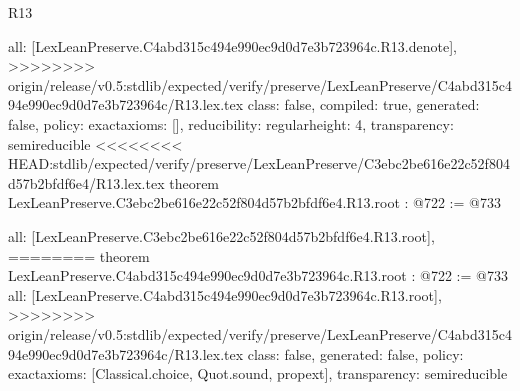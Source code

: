 \begin{lexlean}{R13}
\begin{coremodule}
{{{{{{{{{  all: [LexLeanPreserve.C4abd315c494e990ec9d0d7e3b723964c.R13.denote],
>>>>>>>> origin/release/v0.5:stdlib/expected/verify/preserve/LexLeanPreserve/C4abd315c494e990ec9d0d7e3b723964c/R13.lex.tex
  class: false,
  compiled: true,
  generated: false,
  policy: exact{axioms: []},
  reducibility: regular{height: 4},
  transparency: semireducible
}
<<<<<<<< HEAD:stdlib/expected/verify/preserve/LexLeanPreserve/C3ebc2be616e22c52f804d57b2bfdf6e4/R13.lex.tex
theorem LexLeanPreserve.C3ebc2be616e22c52f804d57b2bfdf6e4.R13.root : @722 := @733 {
  all: [LexLeanPreserve.C3ebc2be616e22c52f804d57b2bfdf6e4.R13.root],
========
theorem LexLeanPreserve.C4abd315c494e990ec9d0d7e3b723964c.R13.root : @722 := @733 {
  all: [LexLeanPreserve.C4abd315c494e990ec9d0d7e3b723964c.R13.root],
>>>>>>>> origin/release/v0.5:stdlib/expected/verify/preserve/LexLeanPreserve/C4abd315c494e990ec9d0d7e3b723964c/R13.lex.tex
  class: false,
  generated: false,
  policy: exact{axioms: [Classical.choice, Quot.sound, propext]},
  transparency: semireducible
}

}}}}}}}}}
\end{coremodule}
\end{lexlean}
